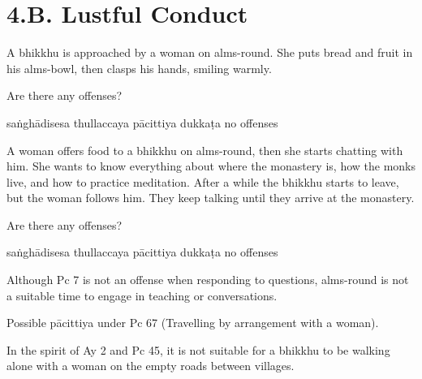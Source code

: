 \chapter{4.B. Lustful Conduct}
\renewcommand*{\theChapterTitle}{4.B. Lustful Conduct}

\begin{exam}{\autoExamName}

\begin{problem}

  A bhikkhu is approached by a woman on alms-round. She puts bread and fruit in
  his alms-bowl, then clasps his hands, smiling warmly.

  Are there any offenses?

  \bigskip

  \begin{answers}{5}
    \bChoices
     saṅghādisesa\eAns
     thullaccaya\eAns
     pācittiya\eAns
     dukkaṭa\eAns
     no offenses\eAns
    \eChoices
  \end{answers}

\end{problem}

\problemDivide

\begin{problem}

  A woman offers food to a bhikkhu on alms-round, then she starts chatting with him.
  She wants to know everything about where the monastery is, how the monks live, and how to practice meditation.
  After a while the bhikkhu starts to leave, but the woman follows him.
  They keep talking until they arrive at the monastery.

  Are there any offenses?

  \bigskip

  \begin{answers}{5}
    \bChoices
     saṅghādisesa\eAns
     thullaccaya\eAns
     pācittiya\eAns
     dukkaṭa\eAns
     no offenses\eAns
    \eChoices
  \end{answers}

  \begin{solution}
    Although Pc 7 is not an offense when responding to questions, alms-round is not a suitable time to engage in teaching or conversations.

    Possible pācittiya under Pc 67 (Travelling by arrangement with a woman).

    In the spirit of Ay 2 and Pc 45, it is not suitable for a bhikkhu to be walking alone with a woman on the empty roads between villages.
  \end{solution}


\end{problem}
\end{exam}
